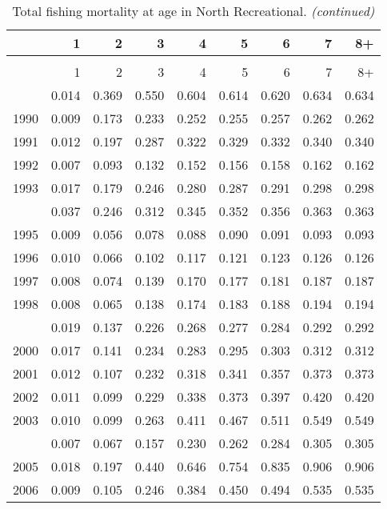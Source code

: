 \documentclass[
]{article}
\begin{document}
\begin{longtable}[t]{lrrrrrrrr}
\caption{\label{tab:North_Recreational-fleet-FAA-table}Total fishing mortality at age in North Recreational.}\\
\toprule
  & 1 & 2 & 3 & 4 & 5 & 6 & 7 & 8+\\
\midrule
\endfirsthead
\caption[]{Total fishing mortality at age in North Recreational. \textit{(continued)}}\\
\toprule
  & 1 & 2 & 3 & 4 & 5 & 6 & 7 & 8+\\
\midrule
\endhead

\endfoot
\bottomrule
\endlastfoot
1989 & 0.014 & 0.369 & 0.550 & 0.604 & 0.614 & 0.620 & 0.634 & 0.634\\
1990 & 0.009 & 0.173 & 0.233 & 0.252 & 0.255 & 0.257 & 0.262 & 0.262\\
1991 & 0.012 & 0.197 & 0.287 & 0.322 & 0.329 & 0.332 & 0.340 & 0.340\\
1992 & 0.007 & 0.093 & 0.132 & 0.152 & 0.156 & 0.158 & 0.162 & 0.162\\
1993 & 0.017 & 0.179 & 0.246 & 0.280 & 0.287 & 0.291 & 0.298 & 0.298\\
\addlinespace
1994 & 0.037 & 0.246 & 0.312 & 0.345 & 0.352 & 0.356 & 0.363 & 0.363\\
1995 & 0.009 & 0.056 & 0.078 & 0.088 & 0.090 & 0.091 & 0.093 & 0.093\\
1996 & 0.010 & 0.066 & 0.102 & 0.117 & 0.121 & 0.123 & 0.126 & 0.126\\
1997 & 0.008 & 0.074 & 0.139 & 0.170 & 0.177 & 0.181 & 0.187 & 0.187\\
1998 & 0.008 & 0.065 & 0.138 & 0.174 & 0.183 & 0.188 & 0.194 & 0.194\\
\addlinespace
1999 & 0.019 & 0.137 & 0.226 & 0.268 & 0.277 & 0.284 & 0.292 & 0.292\\
2000 & 0.017 & 0.141 & 0.234 & 0.283 & 0.295 & 0.303 & 0.312 & 0.312\\
2001 & 0.012 & 0.107 & 0.232 & 0.318 & 0.341 & 0.357 & 0.373 & 0.373\\
2002 & 0.011 & 0.099 & 0.229 & 0.338 & 0.373 & 0.397 & 0.420 & 0.420\\
2003 & 0.010 & 0.099 & 0.263 & 0.411 & 0.467 & 0.511 & 0.549 & 0.549\\
\addlinespace
2004 & 0.007 & 0.067 & 0.157 & 0.230 & 0.262 & 0.284 & 0.305 & 0.305\\
2005 & 0.018 & 0.197 & 0.440 & 0.646 & 0.754 & 0.835 & 0.906 & 0.906\\
2006 & 0.009 & 0.105 & 0.246 & 0.384 & 0.450 & 0.494 & 0.535 & 0.535\\

\end{longtable}
\end{document}
